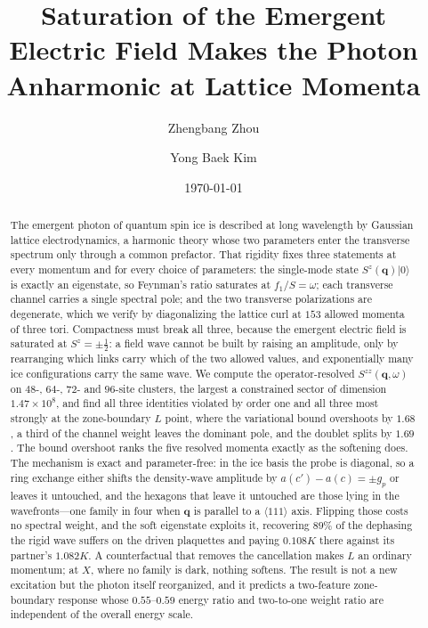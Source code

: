 \documentclass[
aps,prl,twocolumn,amsmath,amssymb,superscriptaddress,
longbibliography,floatfix
]{revtex4-2}
\newcommand{\bq}{\bm q}
\newcommand{\Szz}{S^{zz}}
\begin{document}
\title{Saturation of the Emergent Electric Field Makes the
Photon Anharmonic at Lattice Momenta}

\author{Zhengbang Zhou}

\author{Yong Baek Kim}

\date{\today}

\begin{abstract}
The emergent photon of quantum spin ice is described at long wavelength
by Gaussian lattice electrodynamics, a harmonic theory whose two
parameters enter the transverse spectrum only through a common
prefactor. That rigidity fixes three statements at every momentum and
for every choice of parameters: the single-mode state
$S^z(\bq)|0\rangle$ is exactly an eigenstate, so Feynman's ratio
saturates at $f_1/S=\omega$; each transverse channel carries a single
spectral pole; and the two transverse polarizations are degenerate, which
we verify by diagonalizing the lattice curl at $153$ allowed momenta of
three tori. Compactness must break all three, because the emergent
electric field is saturated at $S^z=\pm\frac12$: a field wave cannot be
built by raising an amplitude, only by rearranging which links carry
which of the two allowed values, and exponentially many ice
configurations carry the same wave. We compute the operator-resolved
$\Szz(\bq,\omega)$ on $48$-, $64$-, $72$- and $96$-site clusters, the
largest a constrained sector of dimension $1.47\times10^{8}$, and find
all three identities violated by order one and all three most strongly at
the zone-boundary $L$ point, where the variational bound overshoots by
$1.68$, a third of the channel weight leaves the dominant pole, and the
doublet splits by $1.69$. The bound overshoot ranks the five resolved
momenta exactly as the softening does. The mechanism is exact and
parameter-free: in the ice basis the probe is diagonal, so a ring
exchange either shifts the density-wave amplitude by
$a(c')-a(c)=\pm g_p$ or leaves it untouched, and the hexagons that leave
it untouched are those lying in the wavefronts---one family in four when
$\bq$ is parallel to a $\langle111\rangle$ axis. Flipping those costs no
spectral weight, and the soft eigenstate exploits it, recovering $89\%$
of the dephasing the rigid wave suffers on the driven plaquettes and
paying $0.108K$ there against its partner's $1.082K$. A counterfactual
that removes the cancellation makes $L$ an ordinary momentum; at $X$,
where no family is dark, nothing softens. The result is not a new
excitation but the photon itself reorganized, and it predicts a
two-feature zone-boundary response whose $0.55$--$0.59$ energy ratio and
two-to-one weight ratio are independent of the overall energy scale.
\end{abstract}
\end{document}
